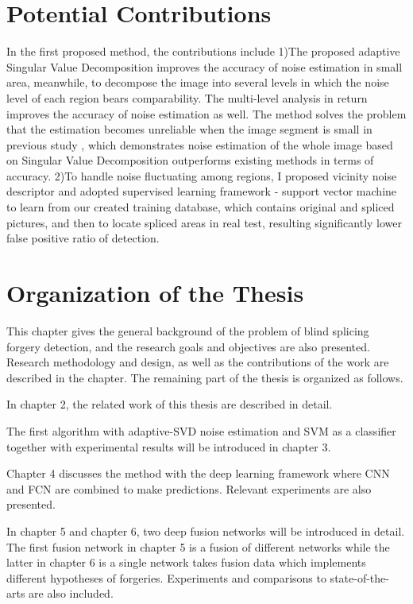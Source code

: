 \documentclass[a4paper, 12pt, twoside]{report}
\begin{document}
\section{Potential Contributions}
In the first proposed method, the contributions include 1)The proposed adaptive Singular Value Decomposition improves the accuracy of noise estimation in small area, meanwhile, to decompose the image into several levels in which the noise level of each region bears comparability. The multi-level analysis in return improves the accuracy of noise estimation as well. The method solves the problem that the estimation becomes unreliable when the image segment is small in previous study \cite{RN54}, which demonstrates noise estimation of the whole image based on Singular Value Decomposition outperforms existing methods in terms of accuracy. 2)To handle noise fluctuating among regions, I proposed vicinity noise descriptor and adopted supervised learning framework - support vector machine to learn from our created training database, which contains original and spliced pictures, and then to locate spliced areas in real test, resulting significantly lower false positive ratio of detection.

\section{Organization of the Thesis}
This chapter gives the general background of the problem of blind splicing forgery detection, and the research goals and objectives are also presented. Research methodology and design, as well as the contributions of the work are described in the chapter. The remaining part of the thesis is organized as follows. 

In chapter 2, the related work of this thesis are described in detail. 

The first algorithm with adaptive-SVD noise estimation and SVM as a classifier together with experimental results will be introduced in chapter 3. 

Chapter 4 discusses the method with the deep learning framework where CNN and FCN are combined to make predictions. Relevant experiments are also presented.

In chapter 5 and chapter 6, two deep fusion networks will be introduced in detail. The first fusion network in chapter 5 is a fusion of different networks while the latter in chapter 6 is a single network takes fusion data which implements different hypotheses of forgeries. Experiments and comparisons to state-of-the-arts are also included. 
\end{document}
